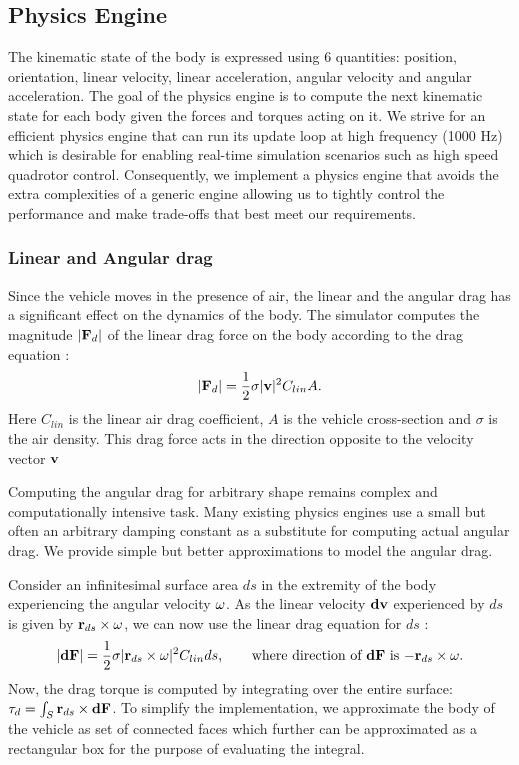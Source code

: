 \documentclass[graybox]{svmult}
\begin{document}
\subsection{Physics Engine}
The kinematic state of the body is expressed using 6 quantities: position, orientation, linear velocity, linear acceleration, angular velocity and angular acceleration. The goal of the physics engine is to compute the next kinematic state for each body given the forces and torques acting on it. We strive for an efficient physics engine that can run its update loop at high frequency (1000 Hz) which is desirable for enabling real-time simulation scenarios such as high speed quadrotor control. Consequently, we implement a physics engine that avoids the extra complexities of a generic engine allowing us to tightly control the performance and make trade-offs that best meet our requirements.

\subsubsection{Linear and Angular drag}
Since the vehicle moves in the presence of air, the linear and the angular drag has a significant effect on the dynamics of the body. The simulator computes the magnitude $|{\bf F}_d|$ of the linear drag force on the body according to the drag equation \cite{taylor2005classical}:
\begin{equation*}
|{\bf F}_d| = \frac{1}{2}\sigma |{\bf v}|^2 C_{lin} A.
\end{equation*}
Here $C_{lin}$ is the linear air drag coefficient, $A$ is the vehicle cross-section and $\sigma$ is the air density. This drag force acts in the direction opposite to the velocity vector ${\bf v}$

Computing the angular drag for arbitrary shape remains complex and computationally intensive task. Many existing physics engines use a small but often an arbitrary damping constant as a substitute for computing actual angular drag. We provide simple but better approximations to model the angular drag.

Consider an infinitesimal surface area $ds$ in the extremity of the body experiencing the angular velocity ${\bf \omega}$. As the linear velocity ${\bf dv}$ experienced by $ds$ is given by ${\bf r}_{ds} \times {\bf \omega}$, we can now use the linear drag equation for $ds$ \cite[pp 160-161]{nakayama1998introduction}:
\begin{equation*}
|{\bf dF}| = \frac{1}{2}\sigma |{\bf r}_{ds} \times {\bf \omega}|^{2} C_{lin} {ds}
\mbox{,\hspace{0.25in} where direction of ${\bf dF}$ is $-{\bf r}_{ds} \times {\bf \omega}$}.
\end{equation*}
Now, the drag torque is computed by integrating over the entire surface: ${\bf \tau}_{d} = \int_{S} {\bf r}_{ds} \times {\bf dF}$.
To simplify the implementation, we approximate the body of the vehicle as set of connected faces which further can be approximated as a rectangular box for the purpose of evaluating the integral.
\end{document}

